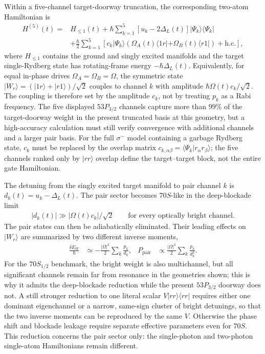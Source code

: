 Within a five-channel target-doorway truncation, the corresponding two-atom
Hamiltonian is
\begin{align}
H^{(5)}(t)
={}&H_{\leq 1}(t)
+\hbar\sum_{k=1}^{5}[u_k-2\Delta_L(t)]
|\Psi_k\rangle\langle\Psi_k| \nonumber\\
&+\frac{\hbar}{2}\sum_{k=1}^{5}
\left[
c_k|\Psi_k\rangle
(\Omega_A(t)\langle 1r|+\Omega_B(t)\langle r1|)+\mathrm{h.c.}
\right],
\label{eq:five-channel-pair-hamiltonian}
\end{align}
where $H_{\leq1}$ contains the ground and singly excited manifolds and the
target single-Rydberg state has rotating-frame energy $-\hbar\Delta_L(t)$.
Equivalently,
for equal in-phase drives $\Omega_A=\Omega_B=\Omega$, the symmetric state
$|W_r\rangle=(|1r\rangle+|r1\rangle)/\sqrt{2}$ couples to channel $k$ with
amplitude $\hbar\Omega(t)c_k/\sqrt{2}$.  The coupling is therefore set by the
amplitude $c_k$, not by treating $p_k$ as a Rabi frequency.  The five displayed
$53P_{3/2}$ channels capture more than $99\%$ of the target-doorway weight in
the present truncated basis at this geometry, but a high-accuracy calculation
must still verify convergence with additional channels and a larger pair
basis.  For the full $\sigma^-$ model containing a garbage Rydberg state,
$c_k$ must be replaced by the overlap matrix
$c_{k,\alpha\beta}=\langle\Psi_k|r_\alpha r_\beta\rangle$; the five channels
ranked only by $|rr\rangle$ overlap define the target--target block, not the
entire gate Hamiltonian.

The detuning from the singly excited target manifold to pair channel $k$ is
$d_k(t)=u_k-\Delta_L(t)$.  The pair sector becomes $70S$-like in the
deep-blockade limit
\begin{align}
|d_k(t)|\gg |\Omega(t)c_k|/\sqrt{2}
\qquad\text{for every optically bright channel.}
\label{eq:multichannel-blockade-condition}
\end{align}
The pair states can then be adiabatically eliminated.  Their leading effects
on $|W_r\rangle$ are summarized by two different inverse moments,
\begin{align}
\frac{\delta E_{W}}{\hbar}
&\simeq-\frac{|\Omega|^2}{2}\sum_k\frac{p_k}{d_k},
&
P_{\mathrm{pair}}
&\propto\frac{|\Omega|^2}{2}\sum_k\frac{p_k}{d_k^2}.
\label{eq:multichannel-blockade-moments}
\end{align}
For the $70S_{1/2}$ benchmark, the bright weight is also multichannel, but all
significant channels remain far from resonance in the geometries shown; this
is why it admits the deep-blockade reduction while the present $53P_{3/2}$
doorway does not.  A still stronger reduction to one literal scalar
$V|rr\rangle\langle rr|$ requires either one dominant eigenchannel or a narrow,
same-sign cluster of bright detunings, so that the two inverse moments can be
reproduced by the same $V$.  Otherwise the phase shift and blockade leakage require
separate effective parameters even for $70S$.  This reduction concerns the
pair sector only: the single-photon and two-photon single-atom Hamiltonians
remain different.

